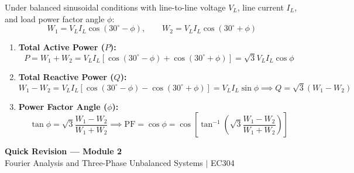 \documentclass[12pt,a4paper]{article}
\begin{document}
\begin{tcolorbox}[formulabox, title={\textbf{Two-Wattmeter Power and Power Factor Relations}}]
Under balanced sinusoidal conditions with line-to-line voltage $V_L$, line current $I_L$, and load power factor angle $\phi$:
\begin{equation}
  W_1 = V_L I_L \cos(30^\circ - \phi), \qquad W_2 = V_L I_L \cos(30^\circ + \phi)
\end{equation}
\begin{enumerate}[leftmargin=*, itemsep=2pt, topsep=1pt]
  \item \textbf{Total Active Power ($P$):}
  \begin{equation}
    P = W_1 + W_2 = V_L I_L [\cos(30^\circ - \phi) + \cos(30^\circ + \phi)] = \sqrt{3} V_L I_L \cos\phi
  \end{equation}
  \item \textbf{Total Reactive Power ($Q$):}
  \begin{equation}
    W_1 - W_2 = V_L I_L [\cos(30^\circ - \phi) - \cos(30^\circ + \phi)] = V_L I_L \sin\phi \implies Q = \sqrt{3}(W_1 - W_2)
  \end{equation}
  \item \textbf{Power Factor Angle ($\phi$):}
  \begin{equation}
    \tan\phi = \sqrt{3} \frac{W_1 - W_2}{W_1 + W_2} \implies \text{PF} = \cos\phi = \cos\left[ \tan^{-1}\left( \sqrt{3}\frac{W_1 - W_2}{W_1 + W_2} \right) \right]
  \end{equation}
\end{enumerate}
\end{tcolorbox}

\newpage
\begin{center}
  {\large\bfseries\color{myred} Quick Revision --- Module 2}\\[3pt]
  {\small\color{mydark} Fourier Analysis and Three-Phase Unbalanced Systems $|$ EC304}
\end{center}
\noindent{\color{myred}\rule{\linewidth}{1.2pt}}
\vspace{4pt}
\end{document}
